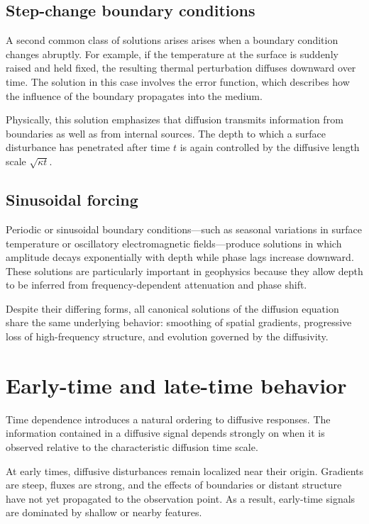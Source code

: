 \subsection{Step-change boundary conditions}

A second common class of solutions arises arises when a boundary condition changes abruptly. For example, if the temperature at the surface is suddenly raised and held fixed, the resulting thermal perturbation diffuses downward over time. The solution in this case involves the error function, which describes how the influence of the boundary propagates into the medium.

Physically, this solution emphasizes that diffusion transmits information from boundaries as well as from internal sources. The depth to which a surface disturbance has penetrated after time $t$ is again controlled by the diffusive length scale $\sqrt{\kappa t}$.

\subsection{Sinusoidal forcing}

Periodic or sinusoidal boundary conditions—such as seasonal variations in surface temperature or oscillatory electromagnetic fields—produce solutions in which amplitude decays exponentially with depth while phase lags increase downward.  These solutions are particularly important in geophysics because they allow depth to be inferred from frequency-dependent attenuation and phase shift.

Despite their differing forms, all canonical solutions of the diffusion equation share the same underlying behavior: smoothing of spatial gradients, progressive loss of high-frequency structure, and evolution governed by the diffusivity.

\section{Early-time and late-time behavior}

Time dependence introduces a natural ordering to diffusive responses. The information contained in a diffusive signal depends strongly on when it is observed relative to the characteristic diffusion time scale.

At early times, diffusive disturbances remain localized near their origin.  Gradients are steep, fluxes are strong, and the effects of boundaries or distant structure have not yet propagated to the observation point. As a result, early-time signals are dominated by shallow or nearby features.


